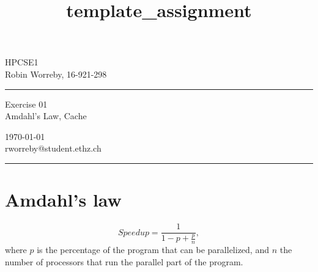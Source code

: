 \documentclass[a4paper,10pt]{article} %
\begin{document}

\title{template_assignment} %
\fancyhead[C]{}
\begin{minipage}{0.295\textwidth} %
\raggedright
HPCSE1\\ %
\footnotesize %
Robin Worreby, 16-921-298 %
\medskip\hrule
\end{minipage}
\begin{minipage}{0.4\textwidth} %
\centering 
\large %
Exercise 01\\ %
\normalsize %
Amdahl’s Law, Cache\\ %
\end{minipage}
\begin{minipage}{0.295\textwidth} %
\raggedleft
\today\\ %
\footnotesize %
rworreby@student.ethz.ch%
\medskip\hrule
\end{minipage}


\setcounter{section}{0}

\section{Amdahl’s law}
\begin{equation}
    Speedup = \frac{1}{1 - p + \frac{p}{n}},
\end{equation} where $p$ is the percentage of the program that can be parallelized, and $n$ the number of processors that run the parallel part of the program.
\end{document}
